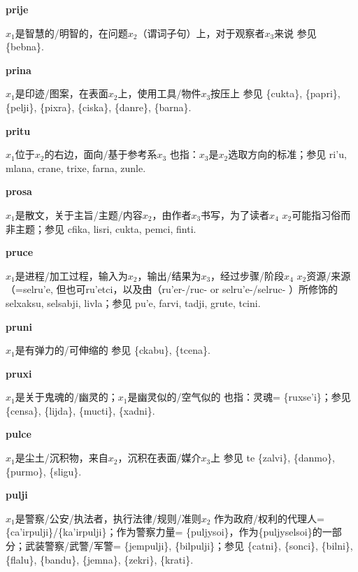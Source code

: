 \documentclass[notitlepage,twocolumn,a4paper,10pt]{book}
\begin{document}
{\sffamily\bfseries prije}\enspace {\ttfamily\bfseries[pij]}  $x_1$是智慧的\slash{}明智的，在问题$x_2$（谓词子句）上，对于观察者$x_3$来说 \textemdash{} 参见 \{bebna\}.

{\sffamily\bfseries prina}\enspace {\ttfamily\bfseries[    pri]}  $x_1$是印迹\slash{}图案，在表面$x_2$上，使用工具\slash{}物件$x_3$按压上 \textemdash{} 参见 \{cukta\}, \{papri\}, \{pelji\}, \{pixra\}, \{ciska\}, \{danre\}, \{barna\}.

{\sffamily\bfseries pritu} $x_1$位于$x_2$的右边，面向\slash{}基于参考系$x_3$ \textemdash{} 也指：$x_3$是$x_2$选取方向的标准；参见 {ri'u}, {mlana}, {crane}, {trixe}, {farna}, {zunle}.

{\sffamily\bfseries prosa}\enspace {\ttfamily\bfseries[ros     ro'a]}  $x_1$是散文，关于主旨\slash{}主题\slash{}内容$x_2$，由作者$x_3$书写，为了读者$x_4$ \textemdash{} $x_2$可能指习俗而非主题；参见 {cfika}, {lisri}, {cukta}, {pemci}, {finti}.

{\sffamily\bfseries pruce}\enspace {\ttfamily\bfseries[ruc     ru'e]}  $x_1$是进程\slash{}加工过程，输入为$x_2$，输出\slash{}结果为$x_3$，经过步骤\slash{}阶段$x_4$ \textemdash{} $x_2$资源\slash{}来源 （={selru'e}, 但也可{ru'etci}，以及由（ru'er-\slash{}ruc- or selru'e-\slash{}selruc- ）所修饰的{selxaksu}, {selsabji}, {livla}；参见 {pu'e}, {farvi}, {tadji}, {grute}, {tcini}.

{\sffamily\bfseries pruni}\enspace {\ttfamily\bfseries[pun]}  $x_1$是有弹力的\slash{}可伸缩的 \textemdash{} 参见 \{ckabu\}, \{tcena\}.

{\sffamily\bfseries pruxi}\enspace {\ttfamily\bfseries[rux     ru'i]}  $x_1$是关于鬼魂的\slash{}幽灵的；$x_1$是幽灵似的\slash{}空气似的 \textemdash{} 也指：灵魂= \{ruxse'i\}；参见 \{censa\}, \{lijda\}, \{mucti\}, \{xadni\}.

{\sffamily\bfseries pulce}\enspace {\ttfamily\bfseries[puc     pu'e]}  $x_1$是尘土\slash{}沉积物，来自$x_2$，沉积在表面\slash{}媒介$x_3$上 \textemdash{} 参见 te \{zalvi\}, \{danmo\}, \{purmo\}, \{sligu\}.

{\sffamily\bfseries pulji} $x_1$是警察\slash{}公安\slash{}执法者，执行法律\slash{}规则\slash{}准则$x_2$ \textemdash{} 作为政府\slash{}权利的代理人= \{ca'irpulji\}\slash{}\{ka'irpulji\}；作为警察力量= \{puljysoi\}，作为\{puljyselsoi\}的一部分；武装警察\slash{}武警\slash{}军警= \{jempulji\}, \{bilpulji\}；参见 \{catni\}, \{sonci\}, \{bilni\}, \{flalu\}, \{bandu\}, \{jemna\}, \{zekri\}, \{krati\}.
\end{document}
